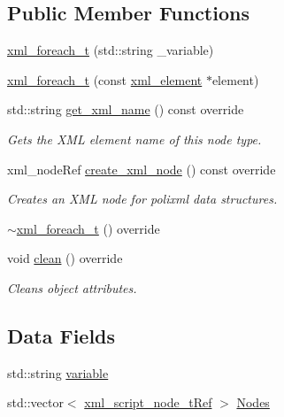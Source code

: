 \subsection*{Public Member Functions}
\begin{DoxyCompactItemize}
\item 
\hyperlink{structxml__foreach__t_a89fa4359e0a17874e38af17944cb2104}{xml\+\_\+foreach\+\_\+t} (std\+::string \+\_\+variable)
\item 
\hyperlink{structxml__foreach__t_ab22830ff0fcf7c2f5c082cbc98fc1f67}{xml\+\_\+foreach\+\_\+t} (const \hyperlink{classxml__element}{xml\+\_\+element} $\ast$element)
\item 
std\+::string \hyperlink{structxml__foreach__t_ad1bf3053ce2cc69b9b6a02402b7f9c22}{get\+\_\+xml\+\_\+name} () const override
\begin{DoxyCompactList}\small\item\em Gets the X\+ML element name of this node type. \end{DoxyCompactList}\item 
xml\+\_\+node\+Ref \hyperlink{structxml__foreach__t_a6056d8114277e5aad52bf31408bd24a2}{create\+\_\+xml\+\_\+node} () const override
\begin{DoxyCompactList}\small\item\em Creates an X\+ML node for polixml data structures. \end{DoxyCompactList}\item 
\hyperlink{structxml__foreach__t_a9dc1c223543a6ecf0cd55846410b9f34}{$\sim$xml\+\_\+foreach\+\_\+t} () override
\item 
void \hyperlink{structxml__foreach__t_a62c4df007dbccbb16e471905c3a64826}{clean} () override
\begin{DoxyCompactList}\small\item\em Cleans object attributes. \end{DoxyCompactList}\end{DoxyCompactItemize}
\subsection*{Data Fields}
\begin{DoxyCompactItemize}
\item 
std\+::string \hyperlink{structxml__foreach__t_adbbef3da3d07538440bf7c7d2f1668f9}{variable}
\item 
std\+::vector$<$ \hyperlink{xml__script__command_8hpp_a1fe3d50ade66bc35e41be9b68bbbcd02}{xml\+\_\+script\+\_\+node\+\_\+t\+Ref} $>$ \hyperlink{structxml__foreach__t_ad384e2c406cf9d90ea61e86f79508ae0}{Nodes}
\end{DoxyCompactItemize}
